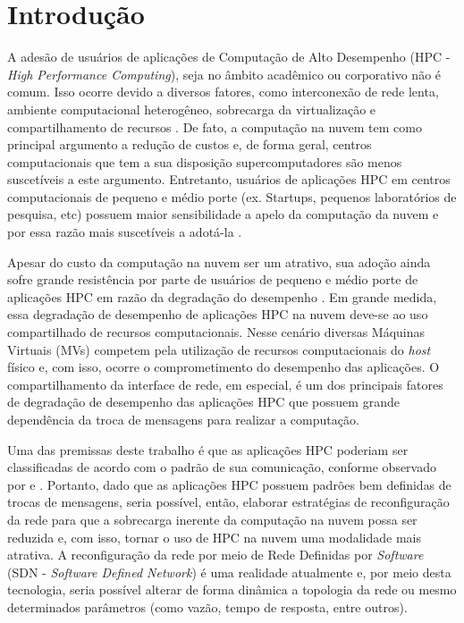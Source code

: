 \documentclass[10pt, conference, compsocconf]{IEEEtran}
\begin{document}
\section{Introdução}
A adesão de usuários de aplicações de Computação de Alto Desempenho (HPC - \textit{High Performance Computing}), seja no âmbito acadêmico ou corporativo não é comum. Isso ocorre devido a diversos fatores, como interconexão de rede lenta, ambiente computacional heterogêneo, sobrecarga da virtualização e compartilhamento de recursos \cite{Gupta:2014}. De fato, a computação na nuvem tem como principal argumento a redução de custos e, de forma geral, centros computacionais que tem a sua disposição supercomputadores são menos suscetíveis a este argumento. Entretanto, usuários de aplicações HPC em centros computacionais de pequeno e médio porte (ex. Startups, pequenos laboratórios de pesquisa, etc) possuem maior sensibilidade a apelo da computação da nuvem e por essa razão mais suscetíveis a adotá-la \cite{Gupta:2014} \cite{Gupta:2013}.

Apesar do custo da computação na nuvem ser um atrativo, sua adoção ainda sofre grande resistência por parte de usuários de pequeno e médio porte de aplicações HPC em razão da degradação do desempenho \cite{Niu:2013}. Em grande medida, essa degradação de desempenho de aplicações HPC na nuvem deve-se ao uso compartilhado de recursos computacionais. Nesse cenário diversas Máquinas Virtuais (MVs) competem pela utilização de recursos computacionais do \textit{host} físico e, com isso, ocorre o comprometimento do desempenho das aplicações. O compartilhamento da interface de rede, em especial, é um dos principais fatores de degradação de desempenho \cite{Gupta:2014} das aplicações HPC que possuem grande dependência da troca de mensagens para realizar a computação.

Uma das premissas deste trabalho é que as aplicações HPC poderiam ser classificadas de acordo com o padrão de sua comunicação, conforme observado por \citet{Gupta:2014} e \citet{Asanovic:2006}. Portanto, dado que as aplicações HPC possuem padrões bem definidas de trocas de mensagens, seria possível, então, elaborar estratégias de reconfiguração da rede para que a sobrecarga inerente da computação na nuvem possa ser reduzida e, com isso, tornar o uso de HPC na nuvem uma modalidade mais atrativa. A reconfiguração da rede por meio de Rede Definidas por \textit{Software} (SDN - \textit {Software Defined Network}) \cite{fundation2012software} é uma realidade atualmente e, por meio desta tecnologia, seria possível alterar de forma dinâmica a topologia da rede ou mesmo determinados parâmetros (como vazão, tempo de resposta, entre outros).
\end{document}

